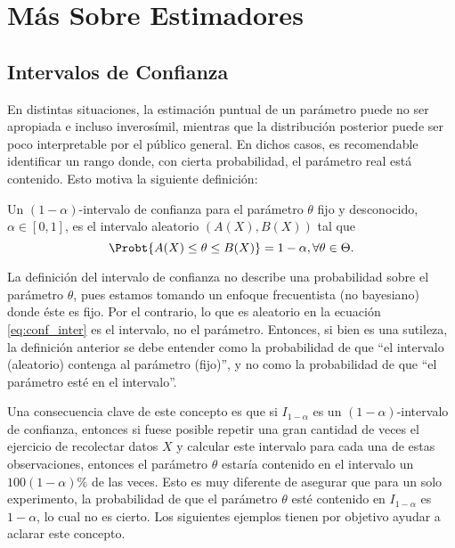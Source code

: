 

\chapter{Más Sobre Estimadores}

\section{Intervalos de Confianza} 

En distintas situaciones, la estimación puntual de un parámetro puede no ser apropiada e incluso inverosímil, mientras que la distribución posterior puede ser poco interpretable por el público general. En dichos casos, es recomendable identificar un rango donde, con cierta probabilidad, el parámetro real está contenido. Esto motiva la siguiente definición: 

\begin{definition}
\label{def:conf_inter} Un $(1-\alpha)$-intervalo de confianza para el parámetro $\theta$ fijo y desconocido, $\alpha\in[0,1]$, es el intervalo aleatorio $(A(X),B(X))$ tal que 
\begin{equation}
	\label{eq:conf_inter}
	\Probt{A(X)\leq\theta\leq B(X)} = 1-\alpha, \forall \theta\in\Theta.
\end{equation}
\end{definition}

\begin{remark}
	La definición del intervalo de confianza no describe una probabilidad sobre el parámetro $\theta$, pues estamos tomando un enfoque frecuentista (no bayesiano) donde éste es fijo. Por el contrario, lo que es aleatorio en la ecuación \eqref{eq:conf_inter} es el intervalo, no el parámetro. Entonces, si bien es una sutileza, la definición anterior se debe entender como la probabilidad de que ``el intervalo (aleatorio) contenga al parámetro (fijo)'', y no como la probabilidad de que ``el parámetro esté en el intervalo''. 
\end{remark}
Una consecuencia clave de este concepto es que si $I_{1-\alpha}$ es un $(1-\alpha)$-intervalo de confianza, entonces si fuese posible repetir una gran cantidad de veces el ejercicio de recolectar datos $X$ y calcular este intervalo para cada una de estas observaciones, entonces el parámetro $\theta$ estaría contenido en el intervalo un $100(1-\alpha)\%$ de las veces. Esto es muy diferente de asegurar que para un solo experimento, la probabilidad de que el parámetro $\theta$ esté contenido en $I_{1-\alpha}$ es $1-\alpha$, lo cual no es cierto. Los siguientes ejemplos tienen por objetivo ayudar a aclarar este concepto.


